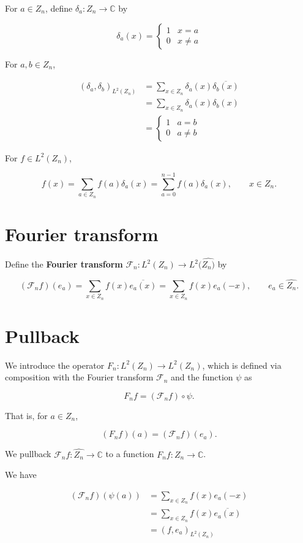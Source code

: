 \documentclass[11pt]{article} %
\begin{document}
For $a \in Z_n$, define $\delta_a:Z_n \to \mathbb{C}$ by

$$
\delta_a(x) = \begin{cases}
1&x=a\\
0&x \neq a
\end{cases}
$$

For $a,b \in Z_n$,

\begin{align*}
(\delta_a, \delta_b)_{L^2(Z_n)} &=\sum_{x \in Z_n} \delta_a(x) \overline{\delta_b(x)} \\
&=\sum_{x \in Z_n} \delta_a(x) \delta_b(x)\\
&= \begin{cases}
1&a = b\\
0&a \neq b
\end{cases}
\end{align*}

For $f \in L^2(Z_n)$,

$$
f(x) =\sum_{a \in Z_n} f(a) \delta_a(x) = \sum_{a=0}^{n-1} f(a) \delta_a(x),\qquad x \in Z_n.
$$

\section{Fourier transform}

Define the \textbf{Fourier transform} $\mathscr{F}_n:L^2(Z_n) \to L^2(\widehat{Z_n)}$ by

$$
(\mathscr{F}_n f)(e_a) =\sum_{x \in Z_n} f(x) \overline{e_a(x)} =  \sum_{x \in Z_n} f(x) e_a(-x), \qquad e_a \in \widehat{Z_n}.
$$

\section{Pullback}

We introduce the operator $F_n: L^2(Z_n) \to L^2(Z_n)$, which is defined via composition with the Fourier transform $\mathscr{F}_n$ and the function $\psi$ as

$$
F_n f = (\mathscr{F}_nf) \circ \psi.
$$

That is, for $a \in Z_n$,

$$
(F_n f)(a) = (\mathscr{F}_nf)(e_a).
$$

We pullback  $\mathscr{F}_nf:\widehat{Z_n} \to \mathbb{C}$ to a function $F_n f: Z_n \to \mathbb{C}$.

We have

\begin{align*}
(\mathscr{F}_nf)(\psi(a))&=\sum_{x \in Z_n} f(x) e_a(-x)\\
&=\sum_{x \in Z_n} f(x) \overline{e_a(x)}\\
&=(f,e_a)_{L^2(Z_n)}
\end{align*}
\end{document}
